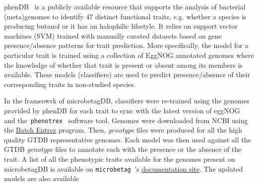 \documentclass[sn-mathphys,Numbered, lineno]{sn-jnl}  %
\theoremstyle{thmstyleone}%
\theoremstyle{thmstyletwo}%
\theoremstyle{thmstylethree}%
\newcommand{\microbetag}{\texttt{microbetag }}
\begin{document}
        phenDB~\cite{feldbauer2015prediction} is a publicly available resource that supports the analysis of bacterial (meta)genomes to identify 47 distinct functional traits, e.g. whether a species is producing butanol or it has an halophilic lifestyle. 
        It relies on support vector machines (SVM) trained with manually curated datasets based on gene presence/absence patterns for trait prediction.
        More specifically, the model for a particular trait is trained using a collection of EggNOG annotated genomes where the knowledge of whether that trait is present or absent among its members is available.
        These models (classifiers) are used to predict presence/absence of their corresponding traits in non-studied species. 

        In the frameowrk of microbetagDB, %
        classifiers were re-trained using the genomes provided by phenDB for each trait to sync with the latest version of eggNOG~\cite{huerta2019eggnog} and the~\texttt{phenotrex}~\cite{feldbauer2015prediction} software tool.
        Genomes were downloaded from NCBI using the \href{https://www.ncbi.nlm.nih.gov/sites/batchentrez}{Batch Entrez} program.
        Then, \textit{genotype} files were produced for all the high quality GTDB representative genomes.
        Each model was then used against all the GTDB \textit{genotype} files to annotate each with the presence or the absence of the trait. 
        A list of all the phenotypic traits available for the genomes present on microbetagDB is available on \microbetag's \href{https://hariszaf.github.io/microbetag/docs/modules/phen-traits/}{documentation site}.
        The updated models are also available
\end{document}
